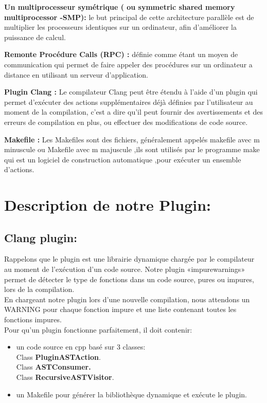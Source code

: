 \documentclass[12pt,titlepage]{article}
\begin{document}
\textbf{ Un multiprocesseur symétrique ( ou symmetric shared memory multiprocessor -SMP): } 
le but principal de cette architecture parallèle  est de multiplier les processeurs identiques sur un ordinateur, afin d’améliorer  la puissance de calcul.\cite{wiki}

\textbf{ Remonte Procédure Calls (RPC) : } définie comme étant un moyen de communication qui permet de faire appeler des procédures sur un ordinateur a distance en utilisant un serveur d'application.\cite{wiki}

\textbf{Plugin Clang :} Le compilateur Clang peut être étendu à l'aide d'un plugin qui permet d'exécuter des actions supplémentaires déjà définies par l'utilisateur au moment de la compilation\cite{ClangTeam}, c'est a dire qu'il peut fournir des avertissements et des erreurs de compilation en plus, ou effectuer des modifications de code source.\cite{clang}

\textbf{Makefile :} Les Makefiles sont des fichiers, généralement appelés makefile avec m minuscule ou Makefile avec m majuscule ,ils sont utilisés par le programme make qui est un logiciel de construction automatique ,pour exécuter un ensemble d'actions.\cite{makefile}
\section{Description de notre Plugin:}

\subsection{Clang plugin:}

Rappelons que le plugin est une librairie dynamique chargée par le compilateur au moment de l’exécution d’un code source.
Notre plugin «impurewarnings»  permet de détecter le type de fonctions dans un code source, pures ou impures, lors de la compilation. \\
En chargeant notre plugin lors d’une nouvelle compilation, nous attendons un WARNING pour chaque fonction impure  et une liste contenant toutes les fonctions impures.\\

Pour qu'un plugin fonctionne parfaitement, il doit contenir: 
\begin{itemize}
    \item un code source en cpp basé sur 3 classes:\\
	 Class \textbf{PluginASTAction}.\\
	 Class  \textbf{ASTConsumer.}\\
	 Class \textbf{RecursiveASTVisitor}.
\item un Makefile  pour générer la bibliothèque dynamique et exécute le plugin.
\end{itemize}
\end{document}
